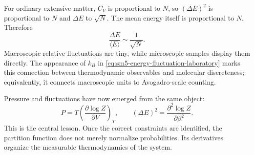 \begin{classroomqa}
\end{classroomqa}

For ordinary extensive matter, \(C_V\) is proportional to \(N\), so
\((\Delta E)^2\) is proportional to \(N\) and \(\Delta E\) to
\(\sqrt{N}\).  The mean energy itself is proportional to \(N\).  Therefore
\begin{equation}
 \frac{\Delta E}{\langle E\rangle}\sim\frac{1}{\sqrt{N}}.
 \label{eq:sm5-relative-fluctuation-scaling}
\end{equation}
Macroscopic relative fluctuations are tiny, while microscopic samples
display them directly.  The appearance of \(k_B\) in
\eqref{eq:sm5-energy-fluctuation-laboratory} marks this connection between
thermodynamic observables and molecular discreteness; equivalently, it
connects macroscopic units to Avogadro-scale counting.

Pressure and fluctuations have now emerged from the same object:
\[
 P=T\left(\frac{\partial\log Z}{\partial V}\right)_T,
 \qquad
 (\Delta E)^2=\frac{\partial^2\log Z}{\partial\beta^2}.
\]
This is the central lesson.  Once the correct constraints are identified,
the partition function does not merely normalize probabilities.  Its
derivatives organize the measurable thermodynamics of the system.
